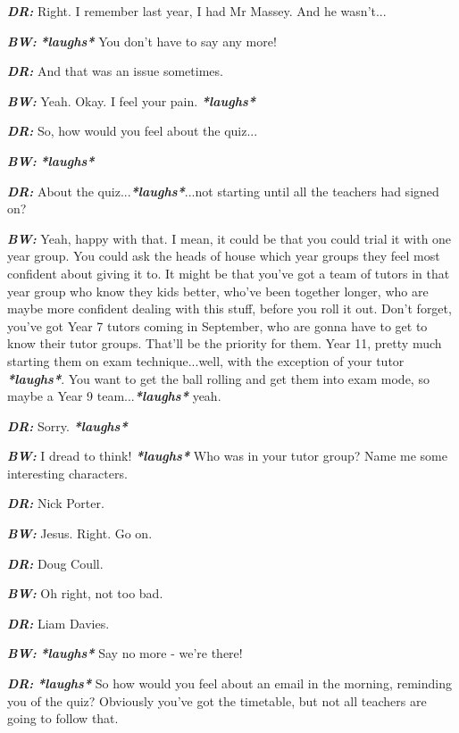 \textit{\textbf{DR:}} Right. I remember last year, I had Mr Massey. And he wasn't...

\textit{\textbf{BW:}} \textit{\textbf{*laughs*}} You don't have to say any more!

\textit{\textbf{DR:}} And that was an issue sometimes.

\textit{\textbf{BW:}} Yeah. Okay. I feel your pain. \textit{\textbf{*laughs*}}

\textit{\textbf{DR:}} So, how would you feel about the quiz...

\textit{\textbf{BW:}} \textit{\textbf{*laughs*}}

\textit{\textbf{DR:}} About the quiz...\textit{\textbf{*laughs*}}...not starting until all the teachers had signed on?

\textit{\textbf{BW:}} Yeah, happy with that. I mean, it could be that you could trial it with one year group. You could ask the heads of house which year groups they feel most confident about giving it to. It might be that you've got a team of tutors in that year group who know they kids better, who've been together longer, who are maybe more confident dealing with this stuff, before you roll it out. Don't forget, you've got Year 7 tutors coming in September, who are gonna have to get to know their tutor groups. That'll be the priority for them. Year 11, pretty much starting them on exam technique...well, with the exception of your tutor \textit{\textbf{*laughs*}}. You want to get the ball rolling and get them into exam mode, so maybe a Year 9 team...\textit{\textbf{*laughs*}} yeah.

\textit{\textbf{DR:}} Sorry. \textit{\textbf{*laughs*}}

\textit{\textbf{BW:}} I dread to think! \textit{\textbf{*laughs*}} Who was in your tutor group? Name me some interesting characters.

\textit{\textbf{DR:}} Nick Porter.

\textit{\textbf{BW:}} Jesus. Right. Go on.

\textit{\textbf{DR:}} Doug Coull.

\textit{\textbf{BW:}} Oh right, not too bad.

\textit{\textbf{DR:}} Liam Davies.

\textit{\textbf{BW:}} \textit{\textbf{*laughs*}} Say no more - we're there!

\textit{\textbf{DR:}} \textit{\textbf{*laughs*}} So how would you feel about an email in the morning, reminding you of the quiz? Obviously you've got the timetable, but not all teachers are going to follow that.

